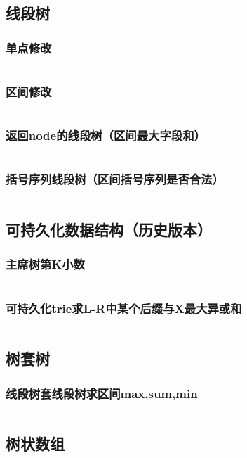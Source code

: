 \documentclass[a4paper,11pt]{article}
\begin{document}
\subsection{线段树} %
\subsubsection{单点修改} %
\inputminted[breaklines]{c++}{数据结构/单点线段树.cpp}
\subsubsection{区间修改} %
\inputminted[breaklines]{c++}{数据结构/区间线段树.cpp}
\subsubsection{返回node的线段树（区间最大字段和）} %
\inputminted[breaklines]{c++}{数据结构/返回node的线段树.cpp}
\subsubsection{括号序列线段树（区间括号序列是否合法）} %
\inputminted[breaklines]{c++}{数据结构/括号序列线段树.cpp}
\subsection{可持久化数据结构（历史版本）} %
\subsubsection{主席树第K小数} %
\inputminted[breaklines]{c++}{数据结构/主席树.cpp}
\subsubsection{可持久化trie求L-R中某个后缀与X最大异或和} %
\inputminted[breaklines]{c++}{数据结构/可持久化trie.cpp}
\subsection{树套树} %
\subsubsection{线段树套线段树求区间max,sum,min} %
\inputminted[breaklines]{c++}{数据结构/线段树套线段树求区间max,sum,min.cpp}
\subsection{树状数组} %
\inputminted[breaklines]{c++}{数据结构/树状数组.cpp}
\end{document}
